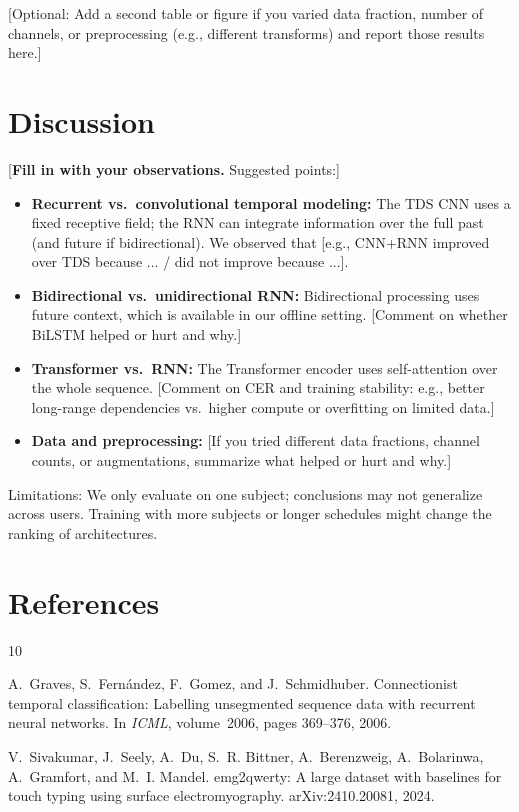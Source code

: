 \documentclass{article}
\begin{document}
[Optional: Add a second table or figure if you varied data fraction, number of channels, or preprocessing (e.g., different transforms) and report those results here.]

\section{Discussion}
\label{sec:discussion}

[\textbf{Fill in with your observations.} Suggested points:]

\begin{itemize}
  \item \textbf{Recurrent vs.\ convolutional temporal modeling:} The TDS CNN uses a fixed receptive field; the RNN can integrate information over the full past (and future if bidirectional). We observed that [e.g., CNN+RNN improved over TDS because ... / did not improve because ...].
  \item \textbf{Bidirectional vs.\ unidirectional RNN:} Bidirectional processing uses future context, which is available in our offline setting. [Comment on whether BiLSTM helped or hurt and why.]
  \item \textbf{Transformer vs.\ RNN:} The Transformer encoder uses self-attention over the whole sequence. [Comment on CER and training stability: e.g., better long-range dependencies vs.\ higher compute or overfitting on limited data.]
  \item \textbf{Data and preprocessing:} [If you tried different data fractions, channel counts, or augmentations, summarize what helped or hurt and why.]
\end{itemize}

Limitations: We only evaluate on one subject; conclusions may not generalize across users. Training with more subjects or longer schedules might change the ranking of architectures.

\section*{References}
\label{sec:refs}


\begin{thebibliography}{10}

A.~Graves, S.~Fern\'andez, F.~Gomez, and J.~Schmidhuber.
\newblock Connectionist temporal classification: Labelling unsegmented sequence data with recurrent neural networks.
\newblock In \emph{ICML}, volume~2006, pages 369--376, 2006.

V.~Sivakumar, J.~Seely, A.~Du, S.~R. Bittner, A.~Berenzweig, A.~Bolarinwa, A.~Gramfort, and M.~I. Mandel.
\newblock emg2qwerty: A large dataset with baselines for touch typing using surface electromyography.
\newblock arXiv:2410.20081, 2024.

\end{thebibliography}
\end{document}
